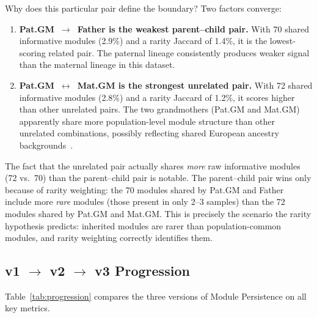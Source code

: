 \documentclass{../yalumba}
\begin{document}
Why does this particular pair define the boundary?  Two factors converge:

\begin{enumerate}
  \item \textbf{Pat.GM~$\to$~Father is the weakest parent--child pair.}
        With 70 shared informative modules (2.9\%) and a rarity Jaccard of
        1.4\%, it is the lowest-scoring related pair.  The paternal lineage
        consistently produces weaker signal than the maternal lineage in this
        dataset.

  \item \textbf{Pat.GM~$\leftrightarrow$~Mat.GM is the strongest unrelated
        pair.}  With 72 shared informative modules (2.8\%) and a rarity
        Jaccard of 1.2\%, it scores higher than other unrelated pairs.  The
        two grandmothers (Pat.GM and Mat.GM) apparently share more
        population-level module structure than other unrelated combinations,
        possibly reflecting shared European ancestry
        backgrounds~\cite{ralph2013ancestry}.
\end{enumerate}

The fact that the unrelated pair actually shares \emph{more} raw informative
modules (72 vs.\ 70) than the parent--child pair is notable.  The parent--child
pair wins only because of rarity weighting: the 70 modules shared by
Pat.GM and Father include more \emph{rare} modules (those present in only
2--3 samples) than the 72 modules shared by Pat.GM and Mat.GM.  This is
precisely the scenario the rarity hypothesis predicts: inherited modules are
rarer than population-common modules, and rarity weighting correctly identifies
them.

\subsection{v1 $\to$ v2 $\to$ v3 Progression}

Table~\ref{tab:progression} compares the three versions of Module Persistence
on all key metrics.
\end{document}
